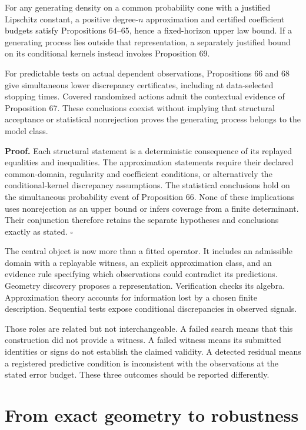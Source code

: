 For any generating density on a common probability cone with a justified
Lipschitz constant, a positive degree-\(n\) approximation and certified
coefficient budgets satisfy Propositions 64--65, hence a fixed-horizon
upper law bound. If a generating process lies outside that
representation, a separately justified bound on its conditional kernels
instead invokes Proposition 69.

For predictable tests on actual dependent observations, Propositions 66
and 68 give simultaneous lower discrepancy certificates, including at
data-selected stopping times. Covered randomized actions admit the
contextual evidence of Proposition 67. These conclusions coexist without
implying that structural acceptance or statistical nonrejection proves
the generating process belongs to the model class.

\textbf{Proof.} Each structural statement is a deterministic consequence
of its replayed equalities and inequalities. The approximation
statements require their declared common-domain, regularity and
coefficient conditions, or alternatively the conditional-kernel
discrepancy assumptions. The statistical conclusions hold on the
simultaneous probability event of Proposition 66. None of these
implications uses nonrejection as an upper bound or infers coverage from
a finite determinant. Their conjunction therefore retains the separate
hypotheses and conclusions exactly as stated. \(\square\)

The central object is now more than a fitted operator. It includes an
admissible domain with a replayable witness, an explicit approximation
class, and an evidence rule specifying which observations could
contradict its predictions. Geometry discovery proposes a
representation. Verification checks its algebra. Approximation theory
accounts for information lost by a chosen finite description. Sequential
tests expose conditional discrepancies in observed signals.

Those roles are related but not interchangeable. A failed search means
that this construction did not provide a witness. A failed witness means
its submitted identities or signs do not establish the claimed validity.
A detected residual means a registered predictive condition is
inconsistent with the observations at the stated error budget. These
three outcomes should be reported differently.

\section{From exact geometry to robustness}\label{LSM:from-exact-geometry-to-robustness}

